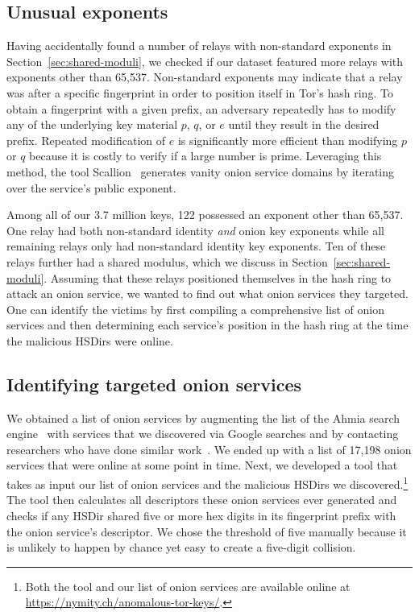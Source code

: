 \subsection{Unusual exponents}
\label{sec:unusual-exponents}
Having accidentally found a number of relays with non-standard exponents in
Section~\ref{sec:shared-moduli}, we checked if our dataset featured more relays
with exponents other than 65,537.  Non-standard exponents may indicate that a
relay was after a specific fingerprint in order to position itself in Tor's hash
ring.  To obtain a fingerprint with a given prefix, an adversary repeatedly has
to modify any of the underlying key material $p$, $q$, or $e$ until they result
in the desired prefix.  Repeated modification of $e$ is significantly more
efficient than modifying $p$ or $q$ because it is costly to verify if a large
number is prime.  Leveraging this method, the tool Scallion~\cite{scallion}
generates vanity onion service domains by iterating over the service's public
exponent.

Among all of our 3.7 million keys, 122 possessed an exponent other than 65,537.
One relay had both non-standard identity \emph{and} onion key exponents while
all remaining relays only had non-standard identity key exponents.  Ten of these
relays further had a shared modulus, which we discuss in
Section~\ref{sec:shared-moduli}.  Assuming that these relays positioned
themselves in the hash ring to attack an onion service, we wanted to find out
what onion services they targeted.  One can identify the victims by first
compiling a comprehensive list of onion services and then determining each
service's position in the hash ring at the time the malicious HSDirs were
online.

\subsection{Identifying targeted onion services}
\label{sec:targeted-onion-services}

We obtained a list of onion services by augmenting the list of the Ahmia
search engine~\cite{ahmia} with services that we discovered via Google searches
and by contacting researchers who have done similar work~\cite{Matic2015a}.  We
ended up with a list of 17,198 onion services that were online at some point in
time.  Next, we developed a tool that takes as input our list of onion services
and the malicious HSDirs we discovered.\footnote{Both the tool and our list of
onion services are available online at
\url{https://nymity.ch/anomalous-tor-keys/}.} The tool then calculates all
descriptors these onion services ever generated and checks if any HSDir shared
five or more hex digits in its fingerprint prefix with the onion service's
descriptor.  We chose the threshold of five manually because it is unlikely to
happen by chance yet easy to create a five-digit collision.

